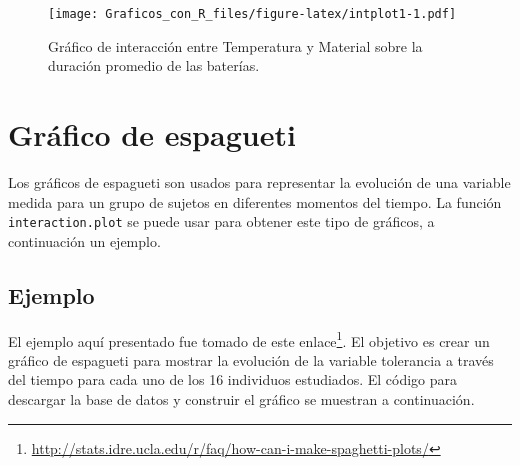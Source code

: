 \documentclass[10pt,]{krantz}
\makeatletter
\newenvironment{Shaded}{\begin{snugshade}}{\end{snugshade}}
\newcommand{\KeywordTok}[1]{\textcolor[rgb]{0.13,0.29,0.53}{\textbf{{#1}}}}
\newcommand{\DataTypeTok}[1]{\textcolor[rgb]{0.13,0.29,0.53}{{#1}}}
\newcommand{\DecValTok}[1]{\textcolor[rgb]{0.00,0.00,0.81}{{#1}}}
\newcommand{\StringTok}[1]{\textcolor[rgb]{0.31,0.60,0.02}{{#1}}}
\newcommand{\NormalTok}[1]{{#1}}
\renewcommand{\href}[2]{#2\footnote{\url{#1}}}
\newenvironment{kframe}{%
\medskip{}
\setlength{\fboxsep}{.8em}
 \def\at@end@of@kframe{}%
 \ifinner\ifhmode%
  \def\at@end@of@kframe{\end{minipage}}%
  \begin{minipage}{\columnwidth}%
 \fi\fi%
 \def\FrameCommand##1{\hskip\@totalleftmargin \hskip-\fboxsep
 \colorbox{shadecolor}{##1}\hskip-\fboxsep
     \hskip-\linewidth \hskip-\@totalleftmargin \hskip\columnwidth}%
 \MakeFramed {\advance\hsize-\width
   \@totalleftmargin\z@ \linewidth\hsize
   \@setminipage}}%
 {\par\unskip\endMakeFramed%
 \at@end@of@kframe}
\renewenvironment{Shaded}{\begin{kframe}}{\end{kframe}}
\makeatother
\begin{document}
\begin{figure}[htbp]
\centering
\texttt{[image: Graficos\_con\_R\_files/figure-latex/intplot1-1.pdf]}
\caption{\label{fig:intplot1}Gráfico de interacción entre Temperatura y
Material sobre la duración promedio de las baterías.}
\end{figure}

\section{\texorpdfstring{Gráfico de espagueti
}{Gráfico de espagueti }}\label{grafico-de-espagueti}

Los gráficos de espagueti son usados para representar la evolución de
una variable medida para un grupo de sujetos en diferentes momentos del
tiempo. La función \texttt{interaction.plot} se puede usar para obtener
este tipo de gráficos, a continuación un ejemplo.

\subsection*{Ejemplo}\label{ejemplo-20}


El ejemplo aquí presentado fue tomado de este
\href{http://stats.idre.ucla.edu/r/faq/how-can-i-make-spaghetti-plots/}{enlace}.
El objetivo es crear un gráfico de espagueti para mostrar la evolución
de la variable tolerancia a través del tiempo para cada uno de los 16
individuos estudiados. El código para descargar la base de datos y
construir el gráfico se muestran a continuación.

\begin{Shaded}
\end{Shaded}
\end{document}
